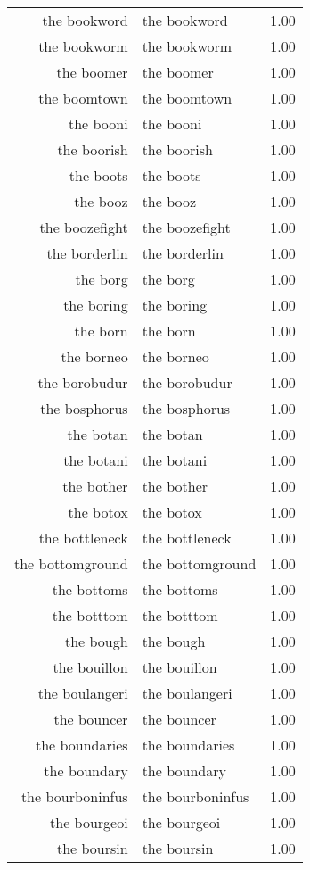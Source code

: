 \begin{table}[ht]
\begin{tabular}{rlr}
  the bookword & the bookword & 1.00 \\ 
  the bookworm & the bookworm & 1.00 \\ 
  the boomer & the boomer & 1.00 \\ 
  the boomtown & the boomtown & 1.00 \\ 
  the booni & the booni & 1.00 \\ 
  the boorish & the boorish & 1.00 \\ 
  the boots & the boots & 1.00 \\ 
  the booz & the booz & 1.00 \\ 
  the boozefight & the boozefight & 1.00 \\ 
  the borderlin & the borderlin & 1.00 \\ 
  the borg & the borg & 1.00 \\ 
  the boring & the boring & 1.00 \\ 
  the born & the born & 1.00 \\ 
  the borneo & the borneo & 1.00 \\ 
  the borobudur & the borobudur & 1.00 \\ 
  the bosphorus & the bosphorus & 1.00 \\ 
  the botan & the botan & 1.00 \\ 
  the botani & the botani & 1.00 \\ 
  the bother & the bother & 1.00 \\ 
  the botox & the botox & 1.00 \\ 
  the bottleneck & the bottleneck & 1.00 \\ 
  the bottomground & the bottomground & 1.00 \\ 
  the bottoms & the bottoms & 1.00 \\ 
  the botttom & the botttom & 1.00 \\ 
  the bough & the bough & 1.00 \\ 
  the bouillon & the bouillon & 1.00 \\ 
  the boulangeri & the boulangeri & 1.00 \\ 
  the bouncer & the bouncer & 1.00 \\ 
  the boundaries & the boundaries & 1.00 \\ 
  the boundary & the boundary & 1.00 \\ 
  the bourboninfus & the bourboninfus & 1.00 \\ 
  the bourgeoi & the bourgeoi & 1.00 \\ 
  the boursin & the boursin & 1.00 \\ 

\end{tabular}
\end{table}
